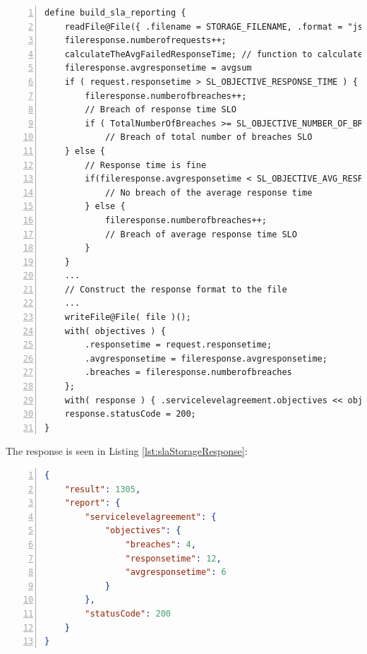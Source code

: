 \documentclass[12pt]{article}
\begin{document}
\begin{lstlisting}[caption=Updates persistent storage file and checks for contractual breaches, captionpos=b, label={lst:slaBuildReport}, frame=single, breaklines=true, numbers=left, basicstyle=\scriptsize]
define build_sla_reporting {
    readFile@File({ .filename = STORAGE_FILENAME, .format = "json" })(fileresponse);
    fileresponse.numberofrequests++;
    calculateTheAvgFailedResponseTime; // function to calculate the total average response time 
    fileresponse.avgresponsetime = avgsum
    if ( request.responsetime > SL_OBJECTIVE_RESPONSE_TIME ) {
        fileresponse.numberofbreaches++;
        // Breach of response time SLO
        if ( TotalNumberOfBreaches >= SL_OBJECTIVE_NUMBER_OF_BREACH_RESPONSE_TIMES ) 
            // Breach of total number of breaches SLO
    } else {
        // Response time is fine
        if(fileresponse.avgresponsetime < SL_OBJECTIVE_AVG_RESPONSE_TIME) {
            // No breach of the average response time
        } else {
            fileresponse.numberofbreaches++;
            // Breach of average response time SLO
        }
    }
    ...
    // Construct the response format to the file
    ...
    writeFile@File( file )();
    with( objectives ) {
        .responsetime = request.responsetime;
        .avgresponsetime = fileresponse.avgresponsetime;
        .breaches = fileresponse.numberofbreaches
    };
    with( response ) { .servicelevelagreement.objectives << objectives };
    response.statusCode = 200;
}
\end{lstlisting}

The response is seen in Listing \ref{lst:slaStorageResponse}:

\begin{lstlisting}[caption=The response to the client when a calculation is requested, 
captionpos=b, language=json, label={lst:slaStorageResponse}, numbers=left]
{
    "result": 1305,
    "report": {
        "servicelevelagreement": {
            "objectives": {
                "breaches": 4,
                "responsetime": 12,
                "avgresponsetime": 6
            }
        },
        "statusCode": 200
    }
}
\end{lstlisting}
\end{document}
